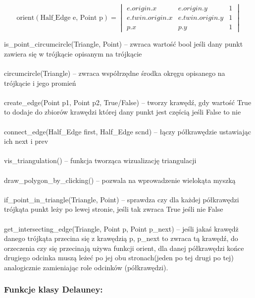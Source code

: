 \documentclass[12pt]{article}
\begin{document}
\begin{equation*}
	\text{orient}(\text{Half\_Edge e, Point p}) = \begin{vmatrix}
		e.origin.x & e.origin.y & 1 \\ 
		e.twin.origin.x & e.twin.origin.y &  1\\ 
		p.x & p.y & 1 
	\end{vmatrix}
\end{equation*}

is\_point\_circumcircle(Triangle, Point) – zwraca wartość bool jeśli dany punkt zawiera się w trójkącie opisanym na trójkącie
\\ \\
circumcircle(Triangle) – zwraca współrzędne środka okręgu opisanego na trójkącie i jego promień
\\ \\
create\_edge(Point p1, Point p2, True/False) – tworzy krawędź, gdy wartość True to dodaje do zbiorów krawędzi której dany punkt jest częścią jeśli False to nie
\\ \\
connect\_edge(Half\_Edge first, Half\_Edge scnd) – łączy półkrawędzie ustawiając ich next i prev
\\ \\
vis\_triangulation() – funkcja tworząca wizualizację triangulacji
\\ \\
draw\_polygon\_by\_clicking() – pozwala na wprowadzenie wielokąta myszką
\\ \\
if\_point\_in\_triangle(Triangle, Point) – sprawdza czy dla każdej półkrawędzi trójkąta punkt leży po lewej stronie, jeśli tak zwraca True jeśli nie False
\\ \\
get\_intersecting\_edge(Triangle, Point p, Point p\_next) – jeśli jakaś krawędż danego trójkąta przecina się z krawędzią p, p\_next to zwraca tą krawędź, do orzeczenia czy się przecinają używa funkcji orient, dla danej półkrawędzi końce drugiego odcinka muszą leżeć po jej obu stronach(jeden po tej drugi po tej) analogicznie zamieniając role odcinków (półkrawędzi).

\newpage

\subsubsection*{Funkcje klasy Delauney:}
\end{document}
